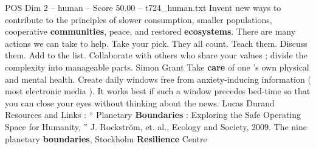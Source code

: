 \begin{textsample}{POS Dim 2 – human – Score 50.00 – t724\_human.txt}
Invent new ways to contribute to the principles of slower consumption, smaller populations, cooperative \textbf{communities}, peace, and restored \textbf{ecosystems}.
There are many actions we can take to help.
Take your pick.
They all count.
Teach them.
Discuss them.
Add to the list.
Collaborate with others who share your values ; divide the complexity into manageable parts.
Simon Grant Take \textbf{care} of one ’s own physical and mental health.
Create daily windows free from anxiety-inducing information ( most electronic media ).
It works best if such a window precedes bed-time so that you can close your eyes without thinking about the news.
Lucas Durand Resources and Links : “ Planetary \textbf{Boundaries} : Exploring the Safe Operating Space for Humanity, ” J.
Rockström, et. al., Ecology and Society, 2009.
The nine planetary \textbf{boundaries}, Stockholm \textbf{Resilience} Centre

\end{textsample}
